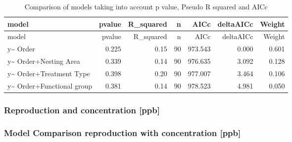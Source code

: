 \documentclass[]{elsarticle} %
\begin{document}
\begin{longtable}[c]{@{}lrrrrrr@{}}
\caption{Comparison of models taking into account p value, Pseudo R
squared and AICc}\tabularnewline
\toprule
model & pvalue & R\_squared & n & AICc & deltaAICc &
Weight\tabularnewline
\midrule
\endfirsthead
\toprule
model & pvalue & R\_squared & n & AICc & deltaAICc &
Weight\tabularnewline
\midrule
\endhead
y\textasciitilde{} Order & 0.225 & 0.15 & 90 & 973.543 & 0.000 &
0.601\tabularnewline
y\textasciitilde{} Order+Nesting Area & 0.339 & 0.14 & 90 & 976.635 &
3.092 & 0.128\tabularnewline
y\textasciitilde{} Order+Treatment Type & 0.398 & 0.20 & 90 & 977.007 &
3.464 & 0.106\tabularnewline
y\textasciitilde{} Order+Functional group & 0.381 & 0.14 & 90 & 978.523
& 4.981 & 0.050\tabularnewline
\bottomrule
\end{longtable}

\subsubsection{Reproduction and concentration
{[}ppb{]}}\label{reproduction-and-concentration-ppb}

\subsubsection{Model Comparison reproduction with concentration
{[}ppb{]}}\label{model-comparison-reproduction-with-concentration-ppb}
\end{document}
